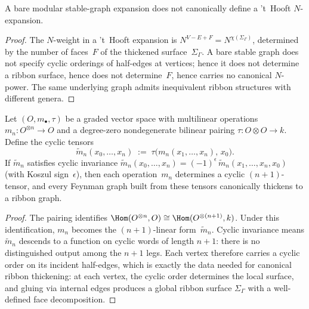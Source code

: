 \begin{lemma}%
\label{lem:bare-graph-no-thooft}%
%
A bare modular stable-graph expansion does not
canonically define a 't~Hooft $N$-expansion.
\end{lemma}

\begin{proof}
The $N$-weight in a 't~Hooft expansion is
$N^{V - E + F} = N^{\chi(\Sigma_\Gamma)}$,
determined by the number of faces~$F$ of the
thickened surface~$\Sigma_\Gamma$.
A bare stable graph does not specify cyclic orderings
of half-edges at vertices; hence it does not determine
a ribbon surface, hence does not determine~$F$,
hence carries no canonical $N$-power.
The same underlying graph admits inequivalent ribbon
structures with different genera.
\end{proof}

\begin{theorem}%
\label{thm:cyclicity-ribbon}%
%
%
Let $(O, m_\bullet, \tau)$ be a graded vector space
with multilinear operations
$m_n\colon O^{\otimes n} \to O$ and a
degree-zero nondegenerate bilinear pairing
$\tau\colon O \otimes O \to k$.
Define the cyclic tensors
\begin{equation}\label{eq:cyclic-tensors}
\tilde{m}_n(x_0,\ldots,x_n)
\;:=\;
\tau\!\bigl(m_n(x_1,\ldots,x_n),\,x_0\bigr).
\end{equation}
If $\tilde{m}_n$ satisfies cyclic invariance
$\tilde{m}_n(x_0,\ldots,x_n) = (-1)^\epsilon\,
\tilde{m}_n(x_1,\ldots,x_n,x_0)$
\textup{(}with Koszul sign~$\epsilon$\textup{)}, then
each operation~$m_n$ determines a cyclic
$(n{+}1)$-tensor, and every Feynman graph built from
these tensors canonically thickens to a ribbon graph.
\end{theorem}

\begin{proof}
The pairing identifies
$\Hom(O^{\otimes n}, O) \cong
\Hom(O^{\otimes(n+1)}, k)$.
Under this identification, $m_n$ becomes the
$(n{+}1)$-linear form~$\tilde{m}_n$.
Cyclic invariance means $\tilde{m}_n$ descends to a
function on cyclic words of length $n{+}1$:
there is no distinguished output among the $n{+}1$ legs.
Each vertex therefore carries a cyclic order on its
incident half-edges, which is exactly the data needed
for canonical ribbon thickening: at each vertex, the
cyclic order determines the local surface, and gluing
via internal edges produces a global ribbon surface
$\Sigma_\Gamma$ with a well-defined face decomposition.
\end{proof}

